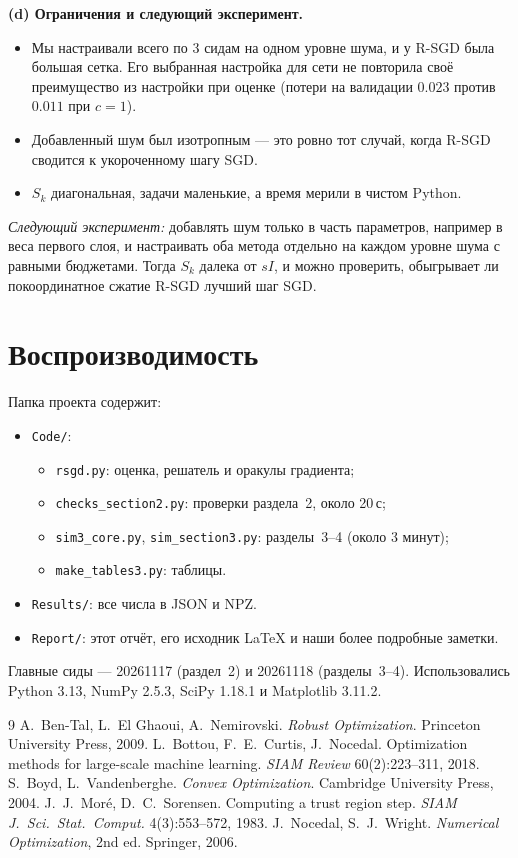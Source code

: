 \documentclass[11pt,a4paper]{article}
\begin{document}
\textbf{(d) Ограничения и следующий эксперимент.}
\begin{itemize}
\item Мы настраивали всего по 3 сидам на одном уровне шума, и у R-SGD была большая сетка. Его
выбранная настройка для сети не повторила своё преимущество из настройки при оценке (потери на
валидации $0.023$ против $0.011$ при $c=1$).
\item Добавленный шум был изотропным — это ровно тот случай, когда R-SGD сводится к укороченному
шагу SGD.
\item $S_k$ диагональная, задачи маленькие, а время мерили в чистом Python.
\end{itemize}
\emph{Следующий эксперимент:} добавлять шум только в часть параметров, например в веса первого слоя,
и настраивать оба метода отдельно на каждом уровне шума с равными бюджетами. Тогда $S_k$ далека от
$sI$, и можно проверить, обыгрывает ли покоординатное сжатие R-SGD лучший шаг SGD.

\section{Воспроизводимость}

Папка проекта содержит:
\begin{itemize}
\item \texttt{Code/}:
  \begin{itemize}
  \item \texttt{rsgd.py}: оценка, решатель и оракулы градиента;
  \item \texttt{checks\_section2.py}: проверки раздела~2, около 20\,с;
  \item \texttt{sim3\_core.py}, \texttt{sim\_section3.py}: разделы~3--4 (около 3 минут);
  \item \texttt{make\_tables3.py}: таблицы.
  \end{itemize}
\item \texttt{Results/}: все числа в JSON и NPZ.
\item \texttt{Report/}: этот отчёт, его исходник LaTeX и наши более подробные заметки.
\end{itemize}
Главные сиды — 20261117 (раздел~2) и 20261118 (разделы~3--4). Использовались Python 3.13, NumPy 2.5.3,
SciPy 1.18.1 и Matplotlib 3.11.2.

\begin{thebibliography}{9}
\small
{} A.~Ben-Tal, L.~El Ghaoui, A.~Nemirovski. \emph{Robust Optimization}. Princeton
University Press, 2009.
 L.~Bottou, F.~E.~Curtis, J.~Nocedal. Optimization methods for large-scale machine
learning. \emph{SIAM Review} 60(2):223--311, 2018.
 S.~Boyd, L.~Vandenberghe. \emph{Convex Optimization}. Cambridge University Press, 2004.
 J.~J.~Moré, D.~C.~Sorensen. Computing a trust region step. \emph{SIAM J.\ Sci.\ Stat.\
Comput.} 4(3):553--572, 1983.
 J.~Nocedal, S.~J.~Wright. \emph{Numerical Optimization}, 2nd ed. Springer, 2006.
\end{thebibliography}
\end{document}
